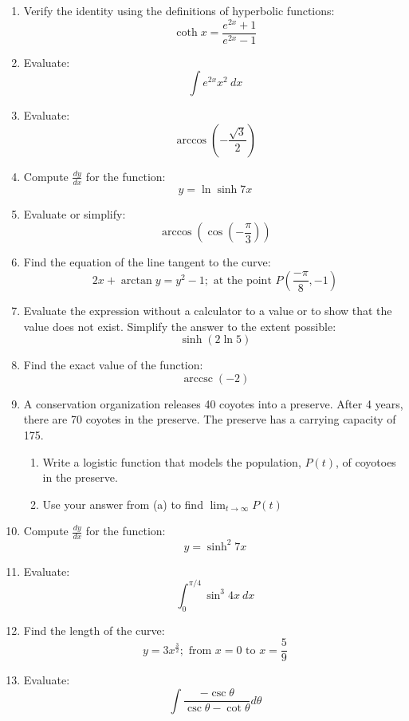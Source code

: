 \documentclass[fleqn]{article}
\DeclareMathOperator{\arccsc}{arccsc}
\begin{document}
\begin{multicols}{2}
\begin{enumerate}
\item Verify the identity using the definitions of hyperbolic functions:
\[\coth x=\frac{e^{2x}+1}{e^{2x}-1}\]

\item Evaluate:
\[\int e^{2x}x^2\ dx\]

\item Evaluate:
\[\arccos\left(-\frac{\sqrt{3}}{2}\right)\]

\item Compute \(\frac{dy}{dx}\) for the function:
\[y=\ln\sinh 7x\]

\item Evaluate or simplify:
\[\arccos\left(\cos\left(-\frac{\pi}{3}\right)\right)\]

\item Find the equation of the line tangent to the curve:
\[2x+\arctan y=y^2-1;\text{ at the point }P(\frac{-\pi}{8},-1)\]

\item Evaluate the expression without a calculator to a value or to show that the value does not exist. Simplify the answer to the extent possible:
\[\sinh(2\ln 5)\]

\item Find the exact value of the function:
\[\arccsc(-2)\]

\item A conservation organization releases 40 coyotes into a preserve. After 4 years, there are 70 coyotes in the preserve. The preserve has a carrying capacity of 175.
\begin{enumerate}[label=\alph*)]
\item Write a logistic function that models the population, \(P(t)\), of coyotoes in the preserve.
\item Use your answer from (a) to find \(\displaystyle\lim_{t\to\infty}P(t)\)
\end{enumerate}

\item Compute \(\frac{dy}{dx}\) for the function:
\[y=\sinh^2 7x\]

\item Evaluate:
\[\int_0^{\pi/4}\sin^3 4x\ dx\]

\item Find the length of the curve:
\[y=3x^{\frac{3}{2}};\text{ from }x=0\text{ to }x=\frac{5}{9}\]

\item Evaluate:
\[\int\frac{-\csc\theta}{\csc\theta-\cot\theta}d\theta\]


\end{enumerate}
\end{multicols}
\end{document}
